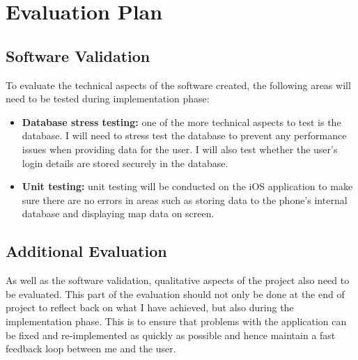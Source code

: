 \chapter{Evaluation Plan} \label{chapter:evaluation-plan}

\section{Software Validation}

To evaluate the technical aspects of the software created, the following areas will need to be tested during implementation phase:

\begin{itemize}
  \item \textbf{Database stress testing:} one of the more technical aspects to test is the database. I will need to stress test the database to prevent any performance issues when providing data for the user. I will also test whether the user's login details are stored securely in the database.
  \item \textbf{Unit testing:} unit testing will be conducted on the iOS application to make sure there are no errors in areas such as storing data to the phone's internal database and displaying map data on screen.
\end{itemize}

\section{Additional Evaluation}

As well as the software validation, qualitative aspects of the project also need to be evaluated. This part of the evaluation should not only be done at the end of project to reflect back on what I have achieved, but also during the implementation phase. This is to ensure that problems with the application can be fixed and re-implemented as quickly as possible and hence maintain a fast feedback loop between me and the user.

